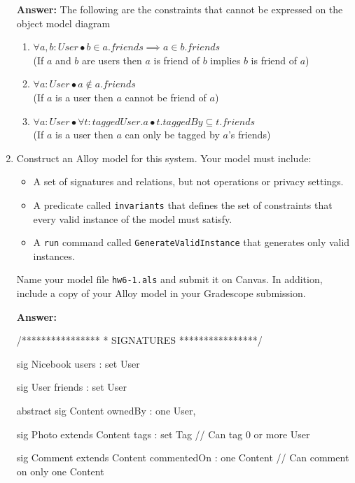 \begin{enumerate}
        \textbf {Answer:} The following are the constraints that cannot be expressed on the object model diagram
            \begin {enumerate}
                \item $ \forall a, b: User \bullet b \in a.friends \implies a \in b.friends $\\
(If $a$ and $b$ are users then $a$ is friend of $b$ implies $b$ is friend of $a$)
                \item $ \forall a : User \bullet a \notin a.friends $\\
                    (If $a$ is a user then $a$ cannot be friend of $a$)
                \item $ \forall a : User \bullet \forall t : taggedUser.a \bullet t.taggedBy \subseteq t.friends $ \\
                    (If $a$ is a user then $a$ can only be tagged by $a$’s friends)
            \end {enumerate}
	\item Construct an Alloy model for this system. Your model must
	      include:
	      \begin{itemize}
		      \item A set of signatures and relations, but not operations or
		            privacy settings.
		      \item A predicate called \texttt{invariants} that defines the
		            set of constraints that every valid instance of the model must satisfy.
		      \item A \texttt{run} command called \texttt{GenerateValidInstance} that generates only valid instances.
	      \end{itemize}
	      Name your model file \texttt{hw6-1.als}  and submit it on
	      Canvas. In addition, include a copy of your Alloy model in your
	      Gradescope submission. 

          \smallskip \textbf{Answer:} 
          \begin{alloy}
/****************
 * SIGNATURES
 ****************/

sig Nicebook {
  users : set User
}

sig User {
  friends : set User
}

abstract sig Content {
  ownedBy : one User,
}

sig Photo extends Content {
    tags : set Tag  // Can tag 0 or more User
}

sig Comment extends Content {
  commentedOn : one Content // Can comment on only one Content
}


\end{alloy}
\end{enumerate}
